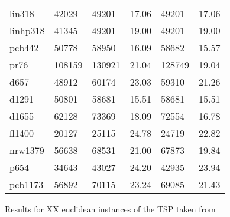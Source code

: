 \begin{figure}[ht]
\begin{minipage}{\linewidth}
\begin{tabular*}{\linewidth}{*{6}{l}}
			lin318   & 42029  & 49201  & 17.06 & 49201  & 17.06 \\
			linhp318 & 41345  & 49201  & 19.00 & 49201  & 19.00 \\
			pcb442   & 50778  & 58950  & 16.09 & 58682  & 15.57 \\
			pr76     & 108159 & 130921 & 21.04 & 128749 & 19.04 \\
			d657     & 48912  & 60174  & 23.03 & 59310  & 21.26 \\
			d1291    & 50801  & 58681  & 15.51 & 58681  & 15.51 \\
			d1655    & 62128  & 73369  & 18.09 & 72554  & 16.78 \\
			fl1400   & 20127  & 25115  & 24.78 & 24719  & 22.82 \\
			nrw1379  & 56638  & 68531  & 21.00 & 67873  & 19.84 \\
			p654     & 34643  & 43027  & 24.20 & 42935  & 23.94 \\
			pcb1173  & 56892  & 70115  & 23.24 & 69085  & 21.43 \\
			\bottomrule
		\end{tabular*}
	\end{minipage}
	
	\caption{Results for XX euclidean instances of the TSP taken from \cite{REINELT1995}}
	\label{fig:STSP}
\end{figure}
